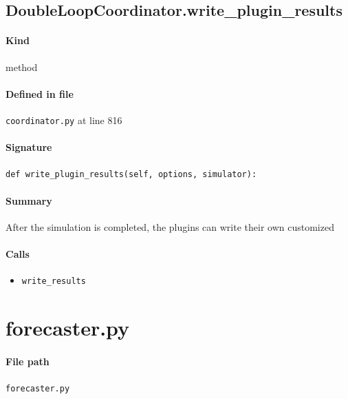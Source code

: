\documentclass[11pt]{report}
\begin{document}
\subsection{DoubleLoopCoordinator.write\_plugin\_results}
\label{def:coordinator.py:DoubleLoopCoordinator.write_plugin_results:L816}
\paragraph{Kind} method
\paragraph{Defined in file} \texttt{coordinator.py} at line 816
\paragraph{Signature} \texttt{def write\_plugin\_results(self, options, simulator):}
\paragraph{Summary} After the simulation is completed, the plugins can write their own customized
\paragraph{Calls}
\begin{itemize}[leftmargin=*]
  \item \texttt{write\_results}
\end{itemize}

\section{forecaster.py}
\label{file:forecaster.py}
\paragraph{File path} \texttt{forecaster.py}
\end{document}
